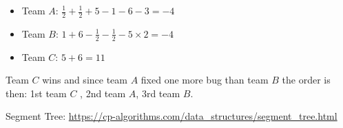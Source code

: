 \documentclass[11pt,a4paper]{article}
\begin{document}
\begin{itemize}
	\item Team $A$: $\frac{1}{2}+\frac{1}{2}+5-1-6-3=-4$
	\item Team $B$: $1+6-\frac{1}{2}-\frac{1}{2}-5\times2=-4$
	\item Team $C$: $5+6=11$
\end{itemize}

Team $C$ wins and since team $A$ fixed one more bug than team $B$ the order is then: 1st team $C$ , 2nd team $A$, 3rd team $B$.





\begin{thebibliography}{9}
Segment Tree: \url{https://cp-algorithms.com/data_structures/segment_tree.html
}
\end{thebibliography}
\end{document}
